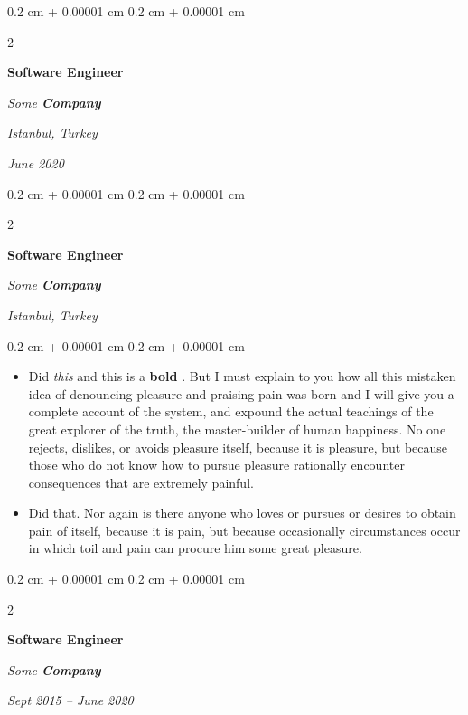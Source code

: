 \documentclass[10pt, letterpaper]{article}
\newenvironment{highlights}{
    \begin{itemize}[
        topsep=0.10 cm,
        parsep=0.10 cm,
        partopsep=0pt,
        itemsep=0pt,
        leftmargin=0.4 cm + 10pt
    ]
}{
    \end{itemize}
} %
\newenvironment{onecolentry}{
    \begin{adjustwidth}{
        0.2 cm + 0.00001 cm
    }{
        0.2 cm + 0.00001 cm
    }
}{
    \end{adjustwidth}
} %
\newenvironment{twocolentry}[2][]{
    \onecolentry
    \def\secondColumn{#2}
    \setcolumnwidth{\fill, 4.5 cm}
    \begin{paracol}{2}
}{
    \switchcolumn \raggedleft \secondColumn
    \end{paracol}
    \endonecolentry
} %
\let\hrefWithoutArrow\href
\renewcommand{\href}[2]{\hrefWithoutArrow{#1}{\ifthenelse{\equal{#2}{}}{ }{#2 }\raisebox{.15ex}{\footnotesize \faExternalLink*}}}
\begin{document}
        \vspace{0.2 cm}

        \begin{twocolentry}{
        \textit{Istanbul, Turkey}    
            
        \textit{June 2020}}
            \textbf{Software Engineer}
            
            \textit{Some \textbf{Company}}
        \end{twocolentry}



        \vspace{0.2 cm}

        \begin{twocolentry}{
        \textit{Istanbul, Turkey}    
            
        }
            \textbf{Software Engineer}
            
            \textit{Some \textbf{Company}}
        \end{twocolentry}

        \vspace{0.10 cm}
        \begin{onecolentry}
            \begin{highlights}
                \item Did \textit{this} and this is a \textbf{bold} \href{https://example.com}{link}. But I must explain to you how all this mistaken idea of denouncing pleasure and praising pain was born and I will give you a complete account of the system, and expound the actual teachings of the great explorer of the truth, the master-builder of human happiness. No one rejects, dislikes, or avoids pleasure itself, because it is pleasure, but because those who do not know how to pursue pleasure rationally encounter consequences that are extremely painful.
                \item Did that. Nor again is there anyone who loves or pursues or desires to obtain pain of itself, because it is pain, but because occasionally circumstances occur in which toil and pain can procure him some great pleasure.
            \end{highlights}
        \end{onecolentry}


        \vspace{0.2 cm}

        \begin{twocolentry}{
            
            
        \textit{Sept 2015 – June 2020}}
            \textbf{Software Engineer}
            
            \textit{Some \textbf{Company}}
        \end{twocolentry}
\end{document}
